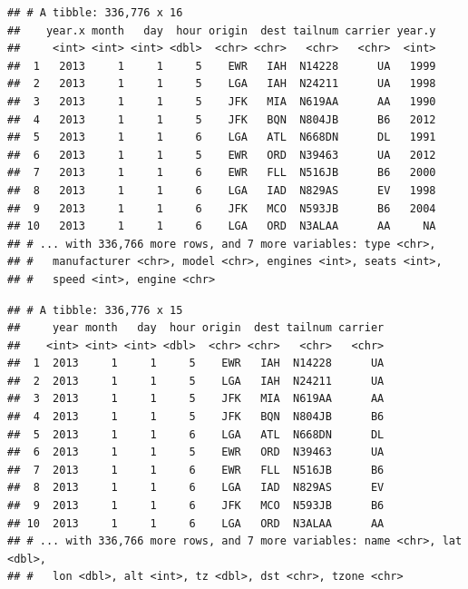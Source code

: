 \documentclass[]{book}
\newenvironment{Shaded}{\begin{snugshade}}{\end{snugshade}}
\newcommand{\KeywordTok}[1]{\textcolor[rgb]{0.13,0.29,0.53}{\textbf{#1}}}
\newcommand{\DataTypeTok}[1]{\textcolor[rgb]{0.13,0.29,0.53}{#1}}
\newcommand{\StringTok}[1]{\textcolor[rgb]{0.31,0.60,0.02}{#1}}
\newcommand{\CommentTok}[1]{\textcolor[rgb]{0.56,0.35,0.01}{\textit{#1}}}
\newcommand{\OperatorTok}[1]{\textcolor[rgb]{0.81,0.36,0.00}{\textbf{#1}}}
\newcommand{\NormalTok}[1]{#1}
\theoremstyle{definition}
\theoremstyle{definition}
\theoremstyle{definition}
\theoremstyle{remark}
\begin{document}
\begin{Shaded}
\end{Shaded}

\begin{verbatim}
## # A tibble: 336,776 x 16
##    year.x month   day  hour origin  dest tailnum carrier year.y
##     <int> <int> <int> <dbl>  <chr> <chr>   <chr>   <chr>  <int>
##  1   2013     1     1     5    EWR   IAH  N14228      UA   1999
##  2   2013     1     1     5    LGA   IAH  N24211      UA   1998
##  3   2013     1     1     5    JFK   MIA  N619AA      AA   1990
##  4   2013     1     1     5    JFK   BQN  N804JB      B6   2012
##  5   2013     1     1     6    LGA   ATL  N668DN      DL   1991
##  6   2013     1     1     5    EWR   ORD  N39463      UA   2012
##  7   2013     1     1     6    EWR   FLL  N516JB      B6   2000
##  8   2013     1     1     6    LGA   IAD  N829AS      EV   1998
##  9   2013     1     1     6    JFK   MCO  N593JB      B6   2004
## 10   2013     1     1     6    LGA   ORD  N3ALAA      AA     NA
## # ... with 336,766 more rows, and 7 more variables: type <chr>,
## #   manufacturer <chr>, model <chr>, engines <int>, seats <int>,
## #   speed <int>, engine <chr>
\end{verbatim}

\begin{Shaded}
\end{Shaded}

\begin{verbatim}
## # A tibble: 336,776 x 15
##     year month   day  hour origin  dest tailnum carrier
##    <int> <int> <int> <dbl>  <chr> <chr>   <chr>   <chr>
##  1  2013     1     1     5    EWR   IAH  N14228      UA
##  2  2013     1     1     5    LGA   IAH  N24211      UA
##  3  2013     1     1     5    JFK   MIA  N619AA      AA
##  4  2013     1     1     5    JFK   BQN  N804JB      B6
##  5  2013     1     1     6    LGA   ATL  N668DN      DL
##  6  2013     1     1     5    EWR   ORD  N39463      UA
##  7  2013     1     1     6    EWR   FLL  N516JB      B6
##  8  2013     1     1     6    LGA   IAD  N829AS      EV
##  9  2013     1     1     6    JFK   MCO  N593JB      B6
## 10  2013     1     1     6    LGA   ORD  N3ALAA      AA
## # ... with 336,766 more rows, and 7 more variables: name <chr>, lat <dbl>,
## #   lon <dbl>, alt <int>, tz <dbl>, dst <chr>, tzone <chr>
\end{verbatim}
\end{document}
